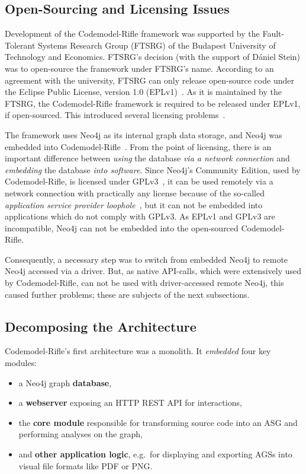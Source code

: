 \subsection{Open-Sourcing and Licensing Issues}

Development of the Codemodel-Rifle framework was supported by the Fault-Tolerant Systems Research Group (FTSRG) of the Budapest University of Technology and Economics. FTSRG's decision (with the support of Dániel Stein) was to open-source the framework under FTSRG's name. According to an agreement with the university, FTSRG can only release open-source code under the Eclipse Public License, version 1.0 (EPLv1)~\cite{eplv1}. As it is maintained by the FTSRG, the Codemodel-Rifle framework is required to be released under EPLv1, if open-sourced. This introduced several licensing problems~\cite{codemodel-rifle-licensing}.

The framework uses Neo4j as its internal graph data storage, and Neo4j was embedded into Codemodel-Rifle~\cite{stein-daniel-msc}. From the point of licensing, there is an important difference between \emph{using} the database \emph{via a network connection} and \emph{embedding} the database \emph{into software}. Since Neo4j's Community Edition, used by Codemodel-Rifle, is licensed under GPLv3~\cite{neo4j-licensing}, it can be used remotely via a network connection with practically any license because of the so-called \emph{application service provider loophole}~\cite{asp-loophole}, but it can not be embedded into applications which do not comply with GPLv3. As EPLv1 and GPLv3 are incompatible, Neo4j can not be embedded into the open-sourced Codemodel-Rifle.

Consequently, a necessary step was to switch from embedded Neo4j to remote Neo4j accessed via a driver. But, as native API-calls, which were extensively used by Codemodel-Rifle, can not be used with driver-accessed remote Neo4j, this caused further problems; these are subjects of the next subsections.


\subsection{Decomposing the Architecture}

Codemodel-Rifle's first architecture was a monolith. It \emph{embedded} four key modules:

\begin{itemize}
\item a Neo4j graph \textbf{database},
\item a \textbf{webserver} exposing an HTTP REST API for interactions,
\item the \textbf{core module} responsible for transforming source code into an ASG and performing analyses on the graph,
\item and \textbf{other application logic}, e.g.\ for displaying and exporting AGSs into visual file formats like PDF or PNG.
\end{itemize}

